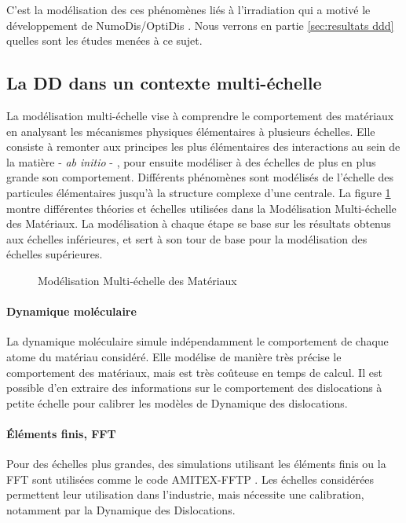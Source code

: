 \documentclass[11pt,class=article,float=false,crop=false]{standalone}
\begin{document}
C'est la modélisation des ces phénomènes liés à l'irradiation qui a motivé le développement de NumoDis/OptiDis . Nous verrons en partie \ref{sec:resultats ddd} quelles sont les études menées à ce sujet.



\subsection{La DD dans un contexte multi-échelle}
\label{sec:multiscale_modeling}

La modélisation multi-échelle vise à comprendre le comportement des matériaux en analysant les mécanismes physiques élémentaires à plusieurs échelles. Elle consiste à remonter aux principes les plus élémentaires des interactions au sein de la matière - \textit{ab initio} - , pour ensuite modéliser à des échelles de plus en plus grande son comportement. Différents phénomènes sont modélisés de l'échelle des particules élémentaires jusqu’à la structure complexe d'une centrale. La figure \ref{fig:multiscale} montre différentes théories et échelles utilisées dans la Modélisation Multi-échelle des Matériaux. La modélisation à chaque étape se base sur les résultats obtenus aux échelles inférieures, et sert à son tour de base pour la modélisation des échelles supérieures.

\begin{figure}[H]
	\centering
	\caption{Modélisation Multi-échelle des Matériaux}
	\label{fig:multiscale}
\end{figure}

\paragraph{Dynamique moléculaire}

La dynamique moléculaire simule indépendamment le comportement de chaque atome du matériau considéré. Elle modélise de manière très précise le comportement des matériaux, mais est très coûteuse en temps de calcul. Il est possible d'en extraire des informations sur le comportement des dislocations à petite échelle pour calibrer les modèles de Dynamique des dislocations.

\paragraph{Éléments finis, FFT}

Pour des échelles plus grandes, des simulations utilisant les éléments finis ou la FFT sont utilisées comme le code AMITEX-FFTP . Les échelles considérées permettent leur utilisation dans l'industrie, mais nécessite une calibration, notamment par la Dynamique des Dislocations.
\end{document}
